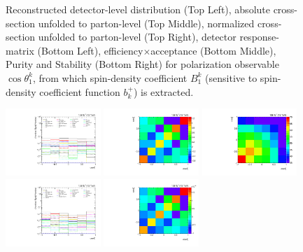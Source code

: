 \begin{refsection}
\begin{figure}[htb]
\begin{center}
\caption{Reconstructed detector-level distribution (Top Left), absolute cross-section unfolded to parton-level (Top Middle), normalized cross-section unfolded to parton-level (Top Right), detector response-matrix (Bottom Left), efficiency$\times$acceptance (Bottom Middle), Purity and Stability (Bottom Right) for polarization observable $\cos\theta_{1}^{k}$, from which spin-density coefficient $B_{1}^{k}$ (sensitive to spin-density coefficient function $b_k^{+}$) is extracted.}
\label{fig:b1k}
\end{center}
\end{figure}
\clearpage
\begin{figure}[htb]
\begin{center}
 \includegraphics[width=0.32\textwidth]{fig_fullRun2UL/unfolding/combined/deltaSystCombinedlog_rebinnedB_b1k.pdf}
 \includegraphics[width=0.32\textwidth]{fig_fullRun2UL/unfolding/combined/StatCovMatrix_rebinnedB_b1k.pdf}
 \includegraphics[width=0.32\textwidth]{fig_fullRun2UL/unfolding/combined/TotalSystCovMatrix_rebinnedB_b1k.pdf} \\
 \includegraphics[width=0.32\textwidth]{fig_fullRun2UL/unfolding/combined/deltaSystCombinedlogNorm_rebinnedB_b1k.pdf}
 \includegraphics[width=0.32\textwidth]{fig_fullRun2UL/unfolding/combined/StatCovMatrixNorm_rebinnedB_b1k.pdf}

\end{center}
\end{figure}
\end{refsection}
